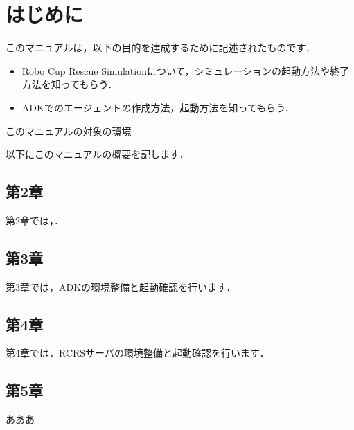 \newcommand{\rcrs}{Robo Cup Rescue Simulation}
\newcommand{\adk}{Agent Development Kit}

\chapter{はじめに}
\thispagestyle{myheadings}

このマニュアルは，以下の目的を達成するために記述されたものです．
\begin{itemize}
    \item \rcrs について，シミュレーションの起動方法や終了方法を知ってもらう．
    \item ADKでのエージェントの作成方法，起動方法を知ってもらう．
\end{itemize}

このマニュアルの対象の環境

以下にこのマニュアルの概要を記します．

\section{第2章}
第2章では，．

\section{第3章}
第3章では，ADKの環境整備と起動確認を行います．

\section{第4章}
第4章では，RCRSサーバの環境整備と起動確認を行います．

\section{第5章}
あああ
